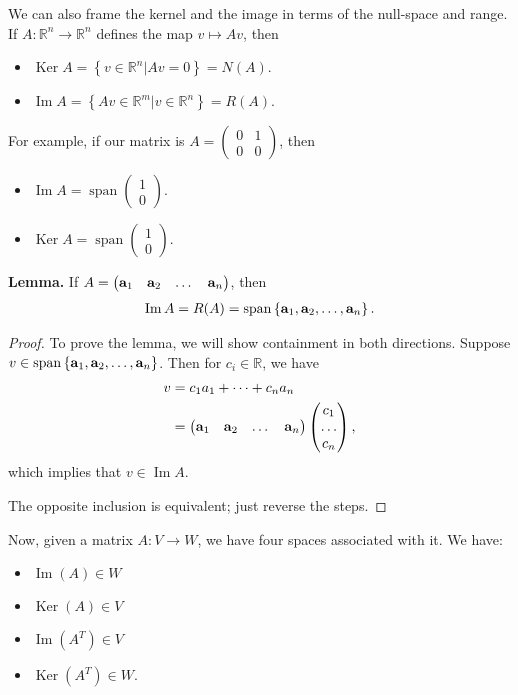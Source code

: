 \documentclass{article}
\newcommand{\mat}[1]{\begin{pmatrix}#1\end{pmatrix}}
\newcommand{\RR}{\mathbb{R}}
\DeclareMathOperator{\Span}{span}
\DeclareMathOperator{\Ker}{Ker}
\DeclareMathOperator{\Ima}{Im}
\DeclareMathOperator{\Ima}{Im}
\begin{document}
We can also frame the kernel and the image in terms of the null-space and range.  If $A: \RR^n \to \RR^n$ defines the map $v \mapsto Av$, then

\begin{itemize}
  \item $\Ker A = \left\{ v \in \RR^n | Av = 0 \right\} = N(A)$.
  \item $\Ima A = \left\{ Av \in \RR^m | v \in \RR^n \right\} = R(A)$.
\end{itemize}

For example, if our matrix is $A = \mat{0 & 1 \\ 0 & 0}$, then

\begin{itemize}
  \item $\Ima A = \Span \mat{1 \\ 0}$.
  \item $\Ker A = \Span \mat{1 \\ 0}$.
\end{itemize}

{\bf Lemma.} If $A = \mat{\mbf{a}_1 & \mbf{a}_2 & \dots & \mbf{a}_n}$, then
\begin{align*}
  \Ima A = R(A) = \Span \left\{ \mbf{a}_1, \mbf{a}_2, \dots, \mbf{a}_n \right\}.
\end{align*}

\begin{proof}
  To prove the lemma, we will show containment in both directions.  Suppose $v \in \Span \left\{ \mbf{a}_1, \mbf{a}_2, \dots, \mbf{a}_n \right\}$.  Then for $c_i \in \RR$, we have
  \begin{align*}
    v &= c_1 a_1 + \dots + c_n a_n \\
    &= \mat{\mbf{a}_1 & \mbf{a}_2 & \dots & \mbf{a}_n} \mat{c_1 \\ \dots \\ c_n},
  \end{align*}
  which implies that $v \in \Ima A$.

The opposite inclusion is equivalent; just reverse the steps.
\end{proof}

Now, given a matrix $A: V \to W$, we have four spaces associated with it.  We have:

\begin{itemize}
  \item $\Ima(A) \in W$
  \item $\Ker(A) \in V$
  \item $\Ima(A^T) \in V$
  \item $\Ker(A^T) \in W$.
\end{itemize}
\end{document}
